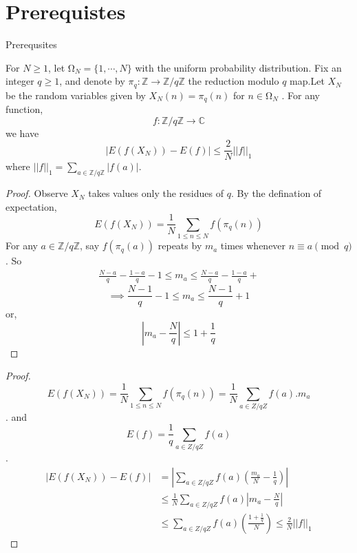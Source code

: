 \documentclass{beamer}
\numberwithin{theorem}{section}
\theoremstyle{definition}
\begin{document}
\section{Prerequistes}
\begin{frame}{Prerequsites}
    \begin{theorem}
        For $N \ge1$, let $\si{\ohm}_N = \{1,\cdots, N\}$ with the uniform probability distribution. Fix an integer $q\ge 1$, and denote by 
        $\pi_q: \mathbb{Z}\rightarrow\mathbb{Z}/q\mathbb{Z}$ the reduction modulo $q$ map.Let $X_N$ be the random variables given by $X_N (n) = \pi_q (n)$ for $n \in \si{\ohm}_N$ . For any function,
        $$f:\mathbb{Z}/q\mathbb{Z}\rightarrow\mathbb{C}$$ we have $$|E(f(X_N))-E(f)|\le \frac{2}{N}||f||_1$$ where $||f||_1=\sum_{a\in \mathbb{Z}/q\mathbb{Z}}|f(a)|$.
    \end{theorem}
    
\end{frame}
\begin{frame}{}
\begin{proof}
     Observe $X_N$ takes values only the residues of $q$. By  the defination of expectation,
       $$E(f(X_N))=\frac{1}{N}\sum_{1\le n\le N}f(\pi_q(n))$$
       For any $a\in \mathbb{Z}/q\mathbb{Z}$, say $f(\pi_q(a))$ repeats by $m_a$
       times  whenever $n\equiv a \pmod{q}$. So 
       \begin{align*}
           \frac{N-a}{q}-\frac{1-a}{q}-1\le m_a\le  \frac{N-a}{q}-\frac{1-a}{q}+
           
       \end{align*}
       $$\implies \frac{N-1}{q}-1\le m_a\le \frac{N-1}{q}+1$$
       or,
       $$\left|m_a-\frac{N}{q}\right|\le 1+\frac{1}{q}$$
       \end{proof}
       \end{frame}
       \begin{frame}[shrink=4]
       \begin{proof}
            $$E(f(X_N))=\frac{1}{N}\sum_{1\le n\le N}f(\pi_q(n))=\frac{1}{N}\sum_{a\in Z/qZ}f(a).m_a$$.
           and $$E(f)=\frac{1}{q}\sum_{a\in Z/qZ}f(a)$$.
           \begin{align*}
            \left|E(f(X_N))-E(f)\right|&=\left|\sum_{a\in Z/qZ}f(a)\left(\frac{m_a}{N}-\frac{1}{q}\right)\right| \\ &\le \frac{1}{N}\sum_{a\in Z/qZ}f(a)\left|m_a-\frac{N}{q}\right|\\
            &\le \sum_{a\in Z/qZ}f(a)\left(\frac{1+\frac{1}{q}}{N}\right)\le \frac{2}{N}||f||_1
           \end{align*}
       \end{proof}
           
       \end{frame}
\end{document}
